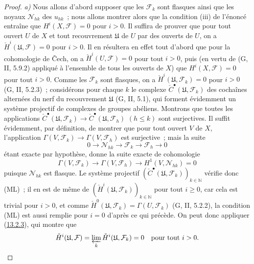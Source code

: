 \begin{proof}
\emph{a)} Nous allons d'abord supposer que les $\mathcal F_k$ sont flasques
ainsi que les noyaux $\mathcal N_{hk}$ des $u_{hk}$~; nous allons montrer
alors que la condition (iii) de l'énoncé entraîne que
$H^i(X,\mathcal F)=0$ pour $i>0$. Il suffira de prouver que pour tout ouvert
$U$ de $X$ et tout recouvrement $\mathfrak U$ de $U$ par des ouverts de
$U$, on a $\check H^i(\mathfrak U,\mathcal F)=0$ pour $i>0$. Il en résultera
en effet tout d'abord que pour la cohomologie de Čech, on a
$\check H^i(U,\mathcal F)=0$ pour tout $i>0$, puis (en vertu de
(G, II, 5.9.2) appliqué à l'ensemble de tous les ouverts de $X$) que
$H^i(X,\mathcal F)=0$ pour tout $i>0$. Comme les $\mathcal F_k$ sont
flasques, on a $\check H^i(\mathfrak U,\mathcal F_k)=0$ pour $i>0$
(G, II, 5.2.3)~; considérons pour chaque $k$ le complexe
$\check C^\bullet(\mathfrak U,\mathcal F_k)$ des cochaînes alternées du nerf
du recouvrement $\mathfrak U$ (G, II, 5.1), qui forment évidemment un
système projectif de complexes de groupes abéliens. Montrons que toutes les
applications
$\check C^\bullet(\mathfrak U,\mathcal F_k)\to
\check C^\bullet(\mathfrak U,\mathcal F_h)$ $(h\leq k)$ sont surjectives.
Il suffit évidemment, par définition, de montrer que pour tout ouvert $V$
de $X$, l'application
$\Gamma(V,\mathcal F_k)\to\Gamma(V,\mathcal F_h)$ est surjective~; mais la
suite
\[
0\longrightarrow\mathcal N_{hk}\longrightarrow\mathcal F_k
\longrightarrow\mathcal F_h\longrightarrow0
\]
étant exacte par hypothèse, donne la suite exacte de cohomologie
\[
\Gamma(V,\mathcal F_k)\longrightarrow\Gamma(V,\mathcal F_h)
\longrightarrow H^1(V,\mathcal N_{hk})=0
\]
puisque $\mathcal N_{hk}$ est flasque. Le système projectif
$(\check C^\bullet(\mathfrak U,\mathcal F_k))_{k\in\mathbb N}$ vérifie donc
(ML)~; il en est de même de
$(\check H^i(\mathfrak U,\mathcal F_k))_{k\in\mathbb N}$ pour tout
$i\geq0$, car cela est trivial pour $i>0$, et comme
$\check H^0(\mathfrak U,\mathcal F_k)=\Gamma(U,\mathcal F_k)$
(G, II, 5.2.2), la condition (ML) est aussi remplie pour $i=0$ d'après ce
qui précède. On peut donc appliquer
(\hyperref[0.13.2.3-fr]{13.2.3}), qui montre que
\[
\check H^i(\mathfrak U,\mathcal F)
=\varprojlim_k\check H^i(\mathfrak U,\mathcal F_k)=0
\quad\hbox{pour tout }i>0.
\]


\end{proof}
